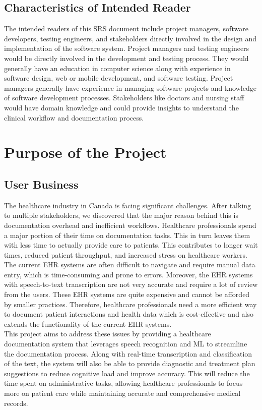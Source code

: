 \documentclass[12pt]{article}
\begin{document}
\subsection{Characteristics of Intended Reader} \label{sec_IntendedReader} 

The intended readers of this SRS document include project managers, software developers, testing engineers, and stakeholders directly involved in the design and implementation of the software system. Project managers and testing engineers would be directly involved in the development and testing process. They would generally have an education in computer science along with experience in software design, web or mobile development, and software testing. Project managers generally have experience in managing software projects and knowledge of software development processes. Stakeholders like doctors and nursing staff would have domain knowledge and could provide insights to understand the clinical workflow and documentation process. 


\section{Purpose of the Project}

\subsection{User Business}

The healthcare industry in Canada is facing significant challenges. After talking to multiple stakeholders, we discovered that the major reason behind this is documentation overhead and inefficient workflows. Healthcare professionals spend a major portion of their time on documentation tasks. This in turn leaves them with less time to actually provide care to patients. This contributes to longer wait times, reduced patient throughput, and increased stress on healthcare workers.\\
The current EHR systems are often difficult to navigate and require manual data entry, which is time-consuming and prone to errors. Moreover, the EHR systems with speech-to-text transcription are not very accurate and require a lot of review from the users. These EHR systems are quite expensive and cannot be afforded by smaller practices. Therefore, healthcare professionals need a more efficient way to document patient interactions and health data which is cost-effective and also extends the functionality of the current EHR systems.\\
This project aims to address these issues by providing a healthcare documentation system that leverages speech recognition and ML to streamline the documentation process. Along with real-time transcription and classification of the text, the system will also be able to provide diagnostic and treatment plan suggestions to reduce cognitive load and improve accuracy. This will reduce the time spent on administrative tasks, allowing healthcare professionals to focus more on patient care while maintaining accurate and comprehensive medical records.\\
\end{document}
